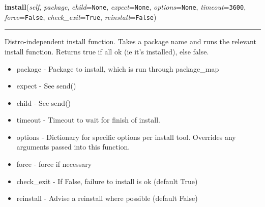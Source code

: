 \hspace{.8\funcindent}\begin{boxedminipage}{\funcwidth}

    \raggedright \textbf{install}(\textit{self}, \textit{package}, \textit{child}={\tt None}, \textit{expect}={\tt None}, \textit{options}={\tt None}, \textit{timeout}={\tt 3600}, \textit{force}={\tt False}, \textit{check\_exit}={\tt True}, \textit{reinstall}={\tt False})

    \vspace{-1.5ex}

    \rule{\textwidth}{0.5\fboxrule}
\setlength{\parskip}{2ex}
    Distro-independent install function. Takes a package name and runs the 
    relevant install function. Returns true if all ok (ie it's installed), 
    else false.

    \begin{itemize}
    \setlength{\parskip}{0.6ex}
      \item package    - Package to install, which is run through package\_map

      \item expect     - See send()

      \item child      - See send()

      \item timeout    - Timeout to wait for finish of install.

      \item options    - Dictionary for specific options per install tool. 
        Overrides any arguments passed into this function.

      \item force      - force if necessary

      \item check\_exit - If False, failure to install is ok (default True)

      \item reinstall  - Advise a reinstall where possible (default False)

    \end{itemize}

\setlength{\parskip}{1ex}
    \end{boxedminipage}

    \label{shutit_global:ShutIt:remove}

    \vspace{0.5ex}

